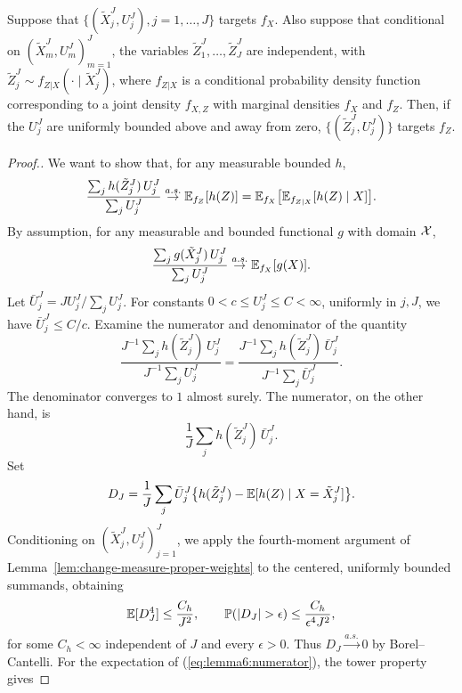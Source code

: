 \documentclass[11pt]{article}
\theoremstyle{thmstylethree}%
\begin{document}
\begin{lem}
\label{lem:marginal-proper-weights}
Suppose that $\{(\tilde X_j^J,U_j^J),j=1,\dots,J\}$ targets $f_X$.
Also suppose that conditional on $(\tilde X_m^J,U_m^J)_{m=1}^J$,
the variables $\tilde Z_1^J,\ldots,\tilde Z_J^J$ are independent, with
$\tilde Z_j^J\sim f_{Z|X}(\cdot\mid\tilde X_j^J)$,
where $f_{Z|X}$ is a conditional probability density function corresponding
to a joint density $f_{X,Z}$ with marginal densities $f_X$ and $f_Z$.
Then, if the $U_j^J$ are uniformly bounded above and away from zero,
$\{(\tilde Z_j^J,U_j^J)\}$ targets $f_Z$.
\end{lem}

\begin{proof}[Proof.]
We want to show that, for any measurable bounded $h$,
\begin{equation}
 \frac{\sum_j h(\tilde Z_j^J)\,U_j^J}{\sum_j U_j^J}
 \stackrel{a.s.}{\to}\mathbb{E}_{f_Z}[h(Z)]
 =\mathbb{E}_{f_X}\big[\mathbb{E}_{f_{Z|X}}[h(Z)\mid X]\big].
\end{equation}
By assumption, for any measurable and bounded functional $g$ with domain ${\mathcal{X}}$,
\begin{equation}\label{eq:lemma2:g}
 \frac{\sum_j g(\tilde X_j^J)\,U_j^J}{\sum_j U_j^J}
 \stackrel{a.s.}{\to}\mathbb{E}_{f_X}[g(X)].
\end{equation}
Let $\bar U_j^J=JU_j^J/\sum_j U_j^J$.
For constants $0<c\le U_j^J\le C<\infty$, uniformly in $j,J$,
we have $\bar U_j^J\le C/c$.
Examine the numerator and denominator of the quantity
\begin{equation}
 \frac{J^{-1}\sum_j h(\tilde Z_j^J)\,U_j^J}{J^{-1}\sum_j U_j^J}
 =\frac{J^{-1}\sum_j h(\tilde Z_j^J)\,\bar U_j^J}
 {J^{-1}\sum_j\bar U_j^J}.
\end{equation}
The denominator converges to $1$ almost surely. The numerator, on the other hand, is
\begin{equation}\label{eq:lemma6:numerator}
 \frac1J\sum_j h(\tilde Z_j^J)\,\bar U_j^J.
\end{equation}
Set
\[
 D_J=\frac1J\sum_j\bar U_j^J
 \bigl\{h(\tilde Z_j^J)-\mathbb{E}[h(Z)\mid X=\tilde X_j^J]\bigr\}.
\]
Conditioning on $(\tilde X_j^J,U_j^J)_{j=1}^J$, we apply the fourth-moment
argument of Lemma~\ref{lem:change-measure-proper-weights} to the centered, uniformly bounded summands, obtaining
\[
 \E[D_J^4]\le\frac{C_h}{J^2},\qquad
 \mathbb P(|D_J|>\epsilon)\le\frac{C_h}{\epsilon^4J^2},
\]
for some $C_h<\infty$ independent of $J$ and every $\epsilon>0$.
Thus $D_J\stackrel{a.s.}{\to}0$ by Borel--Cantelli.
For the expectation of (\ref{eq:lemma6:numerator}), the tower property gives

\end{proof}
\end{document}
